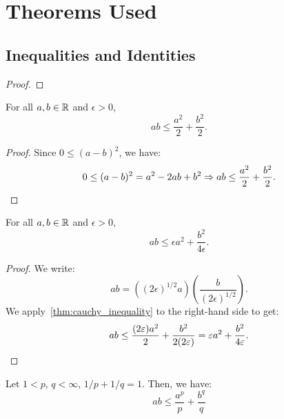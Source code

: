 \section{Theorems Used}

\subsection{Inequalities and Identities}

\begin{theorem}
  \label{thm:triangle_inequality}
\end{theorem}

\begin{proof}
\end{proof}

\begin{theorem}
  \label{thm:cauchy_inequality}

  For all $a, b \in \mathbb{R}$ and $\epsilon > 0$,
  \begin{equation}\label{eq:cauchy_inequality}
    ab \le \frac{a^2}{2} + \frac{b^2}{2}
  .\end{equation}
\end{theorem}

\begin{proof}
  Since $0 \le (a - b)^2$, we have:
  \[%
    0 \le (a - b)^2 = a^2 - 2ab + b^2 \implies ab \le \frac{a^2}{2} + \frac{b^2}{2}
  .\qedhere\]%
\end{proof}

\begin{theorem}
  \label{thm:cauchy_inequality_epsilon}

  For all $a, b \in \mathbb{R}$ and $\epsilon > 0$,
  \begin{equation}\label{eq:cauchy_inequality_epsilon}
    ab \le \epsilon a^2 + \frac{b^2}{4\epsilon}
  .\end{equation}
\end{theorem}

\begin{proof}
  We write:
  \[%
    ab = ((2\epsilon)^{1/2}a)\left(\frac{b}{(2\epsilon)^{1/2}}\right)
  .\]%
  We apply~\cref{thm:cauchy_inequality} to the right-hand side to get:
  \[%
    ab \le \frac{(2\epsilon)a^2}{2} + \frac{b^2}{2(2\epsilon)} = \epsilon a^2 + \frac{b^2}{4\epsilon}
  .\qedhere\]%
\end{proof}

\begin{theorem}
  \label{thm:young_inequality}

  Let $1 < p$, $q < \infty$, $1/p + 1/q = 1$. Then, we have:
  \begin{equation}\label{eq:young_inequality}
    ab \le \frac{a^p}{p} + \frac{b^q}{q}
  \end{equation}
\end{theorem}

